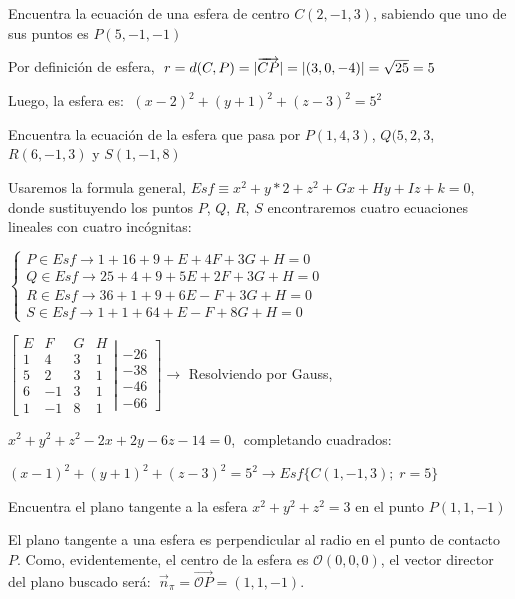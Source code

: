 \begin{ejem}
Encuentra la ecuación de una esfera de centro $C(2,-1,3)$, sabiendo que uno de sus puntos es $P(5,-1,-1)$	
\end{ejem}

\noindent Por definición de esfera, $\; r=d(C,P)=|\overrightarrow{CP}|=\abs{(3,0,-4)}=\sqrt{25}=5$ 

\noindent Luego, la esfera es: $\;(x-2)^2+(y+1)^2+(z-3)^2=5^2$

\begin{ejem}
	Encuentra la ecuación de la esfera que pasa por $P(1,4,3)$, $Q(5,2,3$, $R(6,-1,3)$ y $S(1,-1,8)$
\end{ejem}

\noindent Usaremos la formula general, $Esf\equiv x^2+y*2+z^2+Gx+Hy+Iz+k=0$, donde sustituyendo los puntos $P$, $Q$, $R$, $S$ encontraremos cuatro ecuaciones lineales con cuatro incógnitas:

\noindent $\begin{cases}
P\in Esf \to 1+16+9+E+4F+3G+H=0 \\
Q\in Esf \to 25+4+9+5E+2F+3G+H=0\\
R\in Esf \to 36+1+9+6E-F+3G+H=0 \\
S\in Esf \to 1+1+64+E-F+8G+H=0	
\end{cases}$

\noindent $\left[ \begin{matrix} E&F&G&H \\ 1&4&3&1\\5&2&3&1\\6&-1&3&1\\1&-1&8&1 \end{matrix}\right. \left| \begin{matrix} \\-26\\-38\\-46\\-66\end{matrix}\right] \to $ Resolviendo por Gauss,

\noindent $x^2+y^2+z^2-2x+2y-6z-14=0$, $\;$completando cuadrados:

\noindent $(x-1)^2+(y+1)^2+(z-3)^2=5^2 \to Esf \{  C(1,-1,3);\; r=5 \}$

\begin{ejem}
Encuentra el plano tangente a la esfera $x^2+y^2+z^2=3$ en el  punto $P(1,1,-1)$	
\end{ejem}
\noindent El plano tangente a una esfera es perpendicular al radio en el punto de contacto $P$. Como, evidentemente, el centro de la esfera es $\mathcal O(0,0,0)$, el vector director del plano buscado será: $\; \vec n_{\pi}=\overrightarrow{\mathcal O P}=(1,1,-1)$.

